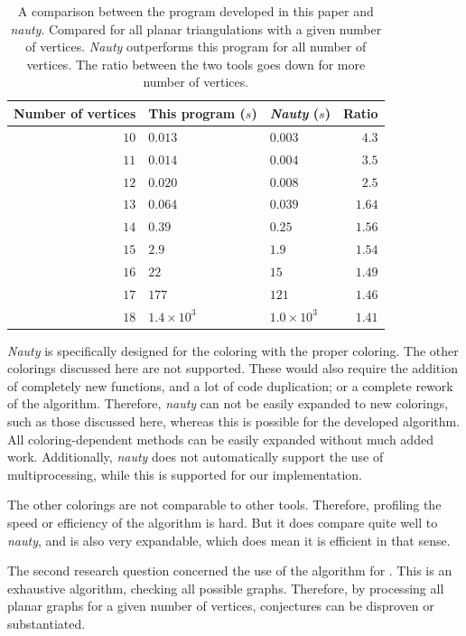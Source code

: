 \documentclass{article}
\begin{document}
\begin{table}
	\centering
	\begin{tabular}{r|ll|r} 
		\hline
		Number of vertices & This program ($s$) & \textit{Nauty} ($s$) & Ratio \\
		\hline
		$10$ & $0.013$ & $0.003$ & $4.3$ \\ 
		$11$ & $0.014$ & $0.004$ & $3.5$ \\
		$12$ & $0.020$ & $0.008$ & $2.5$ \\
		$13$ & $0.064$ & $0.039$ & $1.64$ \\
		$14$ & $0.39$ & $0.25$ & $1.56$ \\
		$15$ & $2.9$ & $1.9$ & $1.54$ \\
		$16$ & $22$ & $15$ & $1.49$ \\
		$17$ & $177$ & $121$ & $1.46$ \\
		$18$ & $1.4 \times 10^{3}$ & $1.0 \times 10^{3}$ & $1.41$
	\end{tabular}
	\caption{A comparison between the program developed in this paper and \textit{nauty}. Compared for all planar triangulations with a given number of vertices. \textit{Nauty} outperforms this program for all number of vertices. The ratio between the two tools goes down for more number of vertices.}\label{tab:nauty}
\end{table}


\textit{Nauty} is specifically designed for the coloring with the proper coloring. The other colorings discussed here are not supported. These would also require the addition of completely new functions, and a lot of code duplication; or a complete rework of the algorithm. Therefore, \textit{nauty} can not be easily expanded to new colorings, such as those discussed here, whereas this is possible for the developed algorithm. All coloring-dependent methods can be easily expanded without much added work. 
Additionally, \textit{nauty} does not automatically support the use of multiprocessing, while this is supported for our implementation. 

The other colorings are not comparable to other tools. Therefore, profiling the speed or efficiency of the algorithm is hard. But it does compare quite well to \textit{nauty}, and is also very expandable, which does mean it is efficient in that sense.


The second research question concerned the use of the algorithm for . This is an exhaustive algorithm, checking all possible graphs. Therefore, by processing all planar graphs for a given number of vertices, conjectures can be disproven or substantiated.
\end{document}
